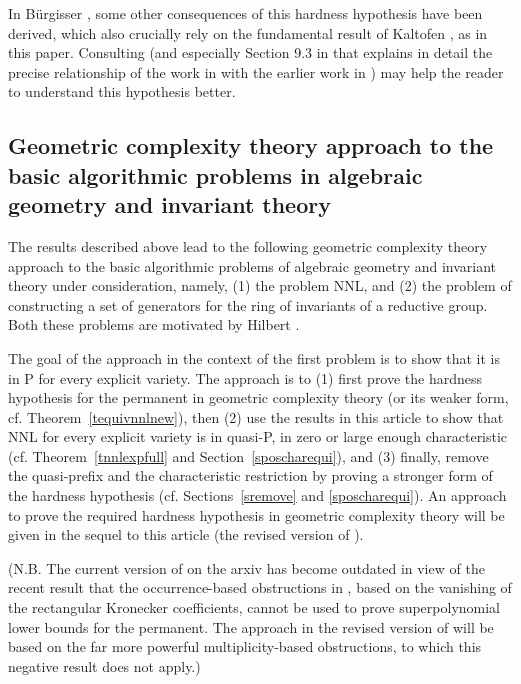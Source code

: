 \documentclass[11pt]{article}
\begin{document}
In B\"urgisser \cite{burg2}, 
some other consequences of this hardness hypothesis 
have been derived, which also crucially
rely on the fundamental result of Kaltofen \cite{kaltofen,kaltofen2}, 
as in this paper. Consulting \cite{GCT1,burg2,GCThyderabad,GCT2,manivel}
(and especially Section 9.3  in \cite{manivel} that  explains
in detail the precise relationship of
the work in \cite{burg2} with the earlier work in \cite{GCT1}) 
may help the reader to   understand    this hypothesis better.

\subsection{Geometric complexity theory approach to the  basic algorithmic  problems in algebraic geometry and invariant theory} \label{sgctapproach}
The results described above lead to the following  geometric complexity theory
approach to the  basic algorithmic  problems of  algebraic geometry and invariant theory under consideration, namely, 
(1) the problem NNL, and
(2) the  problem of constructing a  set of generators for the  ring of invariants 
of a reductive group. Both these problems are motivated by  Hilbert \cite{hilbert}.

The  goal of the approach in the context of the first problem is to show that it 
is in P for every explicit variety. The approach is to (1)  first prove  the  hardness hypothesis \cite{GCT1} for the
permanent in geometric complexity theory (or its weaker form, cf. Theorem~\ref{tequivnnlnew}), 
then  (2) use the results in this article 
to show that NNL for every explicit variety is in quasi-P, in zero or large enough characteristic
(cf. Theorem~\ref{tnnlexpfull} and Section~\ref{sposcharequi}), and (3) finally, 
remove the quasi-prefix and the characteristic restriction  by proving 
a stronger form of the hardness hypothesis (cf. Sections~\ref{sremove} and \ref{sposcharequi}).
An  approach to prove the required hardness hypothesis in geometric complexity theory
will be  given in the sequel to this article
(the revised version of \cite{GCT6}). 

(N.B. The current version of \cite{GCT6} on the arxiv has become   outdated in view of
the recent result  \cite{ikenmeyer} that the occurrence-based obstructions 
in \cite{GCT2},   based on the vanishing of the rectangular Kronecker coefficients,
cannot be used to prove superpolynomial lower bounds for the permanent. The approach in
the revised version of \cite{GCT6} will be based on the far more powerful multiplicity-based obstructions,
to which this negative result does not apply.)
\end{document}
